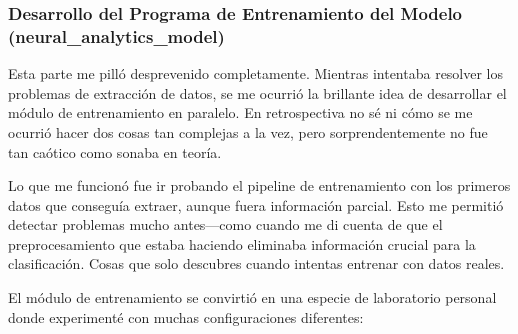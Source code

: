 \subsubsection{Desarrollo del Programa de Entrenamiento del Modelo (neural\_analytics\_model)}

Esta parte me pilló desprevenido completamente. Mientras intentaba resolver los problemas de extracción de datos, se me ocurrió la brillante idea de desarrollar el módulo de entrenamiento en paralelo. En retrospectiva no sé ni cómo se me ocurrió hacer dos cosas tan complejas a la vez, pero sorprendentemente no fue tan caótico como sonaba en teoría. 

Lo que me funcionó fue ir probando el pipeline de entrenamiento con los primeros datos que conseguía extraer, aunque fuera información parcial. Esto me permitió detectar problemas mucho antes—como cuando me di cuenta de que el preprocesamiento que estaba haciendo eliminaba información crucial para la clasificación. Cosas que solo descubres cuando intentas entrenar con datos reales.

El módulo de entrenamiento se convirtió en una especie de laboratorio personal donde experimenté con muchas configuraciones diferentes:

